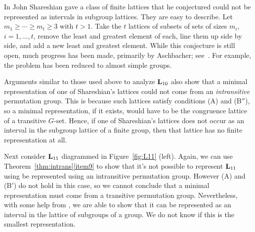 In \cite{Shareshian2003} John Shareshian gave a class of finite lattices that
he conjectured could not be represented as intervals in subgroup lattices.
They are easy to describe. Let $m_1 \ge \cdots \ge m_t \ge 3$ with $t> 1$.
Take the $t$ lattices of subsets of sets of sizes $m_i$, $i=1,\ldots,t$, remove
the least and greatest element of each, line them up side by side, and add
a new least and greatest element. While this conjecture is still open, much
progress has been made, primarily by Aschbacher; see~\cite{Aschbacher2013}.
For example, the problem has been reduced to almost simple groups.


Arguments similar to those used above to analyze $\mathbf{L}_{10}$
also show that a minimal representation of one of Shareshian's
lattices could not come from an \emph{intransitive} permutation group.
This is because such lattices satisfy conditions (A) and (B$''$),
so a minimal representation, if it exists, would have to be
the congruence lattice of a transitive $G$-set.
Hence, if one of Shareshian's lattices does not occur as an
interval in the subgroup lattice of a finite group, then that lattice has
no finite representation at all.



Next consider $\mathbf{L}_{11}$ diagrammed in Figure~\ref{fig:L11} (left). Again, we
can use Theorem~\ref{thm:intrans}\eqref{item9} to show that it's not possible to
represent $\mathbf{L}_{11}$ using be represented using an intransitive permutation group. However (A) and
(B$'$) do not hold in this case, so we cannot conclude that a minimal representation
must come from a transitive permutation group. Nevertheless, with some help from
\gap, we are able to show that it can be represented as an interval
in the lattice of subgroups of a group. We do not know if this is the
smallest representation.


